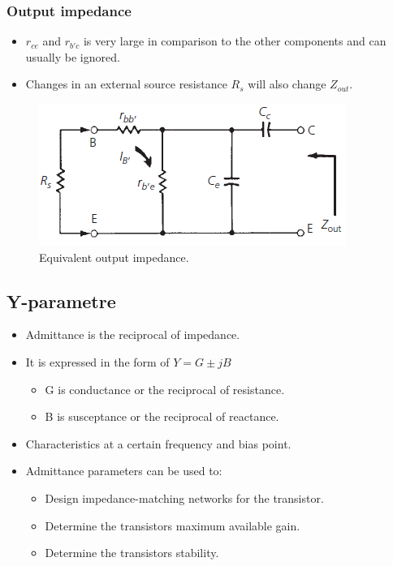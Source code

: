 \subsubsection{Output impedance}

\begin{itemize}
	\item $r_{ce}$ and $r_{b'c}$ is very large in comparison to the other components and can usually be ignored.
	\item Changes in an external source resistance $R_s$ will also change $Z_{out}$.
\end{itemize}

\begin{figure} [H]
	\centering
	\includegraphics[width=0.6\linewidth]{graphics/35.png}
	\caption{Equivalent output impedance.}
	\label{fig:35}
\end{figure}


\subsection{Y-parametre}
\begin{itemize}
	\item Admittance is the reciprocal of impedance.
	\item It is expressed in the form of $Y =G\pm jB$
	\begin{itemize}
		\item G is conductance or the reciprocal of resistance.
		\item B is susceptance or the reciprocal of reactance.
	\end{itemize} 
	\item Characteristics at a certain frequency and bias point.
	\item Admittance parameters can be used to:
	\begin{itemize}
		\item Design impedance-matching networks for the transistor.
		\item Determine the transistors maximum available gain.
		\item Determine the transistors stability.
	\end{itemize}
\end{itemize}

